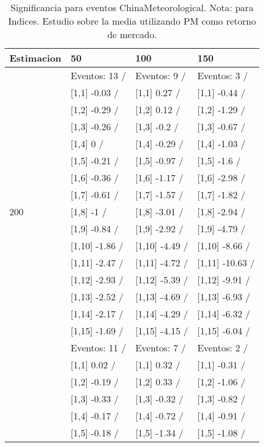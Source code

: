 \begin{table}

\caption{Significancia para eventos ChinaMeteorological. Nota: para Indices. Estudio sobre la media utilizando PM como retorno de mercado.}
\centering
\begin{tabular}[t]{llll}
\toprule
Estimacion & 50 & 100 & 150\\
\midrule
 & Eventos:  13 / & Eventos:  9 / & Eventos:  3 /\\
 & {}[1,1] -0.03  / & {}[1,1] 0.27  / & {}[1,1] -0.44  /\\
 & {}[1,2] -0.29  / & {}[1,2] 0.12  / & {}[1,2] -1.29  /\\
 & {}[1,3] -0.26  / & {}[1,3] -0.2  / & {}[1,3] -0.67  /\\
 & {}[1,4] 0  / & {}[1,4] -0.29  / & {}[1,4] -1.03  /\\
\addlinespace
 & {}[1,5] -0.21  / & {}[1,5] -0.97  / & {}[1,5] -1.6  /\\
 & {}[1,6] -0.36  / & {}[1,6] -1.17  / & {}[1,6] -2.98  /\\
 & {}[1,7] -0.61  / & {}[1,7] -1.57  / & {}[1,7] -1.82  /\\
200 & {}[1,8] -1  / & {}[1,8] -3.01  / & {}[1,8] -2.94  /\\
 & {}[1,9] -0.84  / & {}[1,9] -2.92  / & {}[1,9] -4.79  /\\
\addlinespace
 & {}[1,10] -1.86  / & {}[1,10] -4.49  / & {}[1,10] -8.66  /\\
 & {}[1,11] -2.47  / & {}[1,11] -4.72  / & {}[1,11] -10.63  /\\
 & {}[1,12] -2.93  / & {}[1,12] -5.39  / & {}[1,12] -9.91  /\\
 & {}[1,13] -2.52  / & {}[1,13] -4.69  / & {}[1,13] -6.93  /\\
 & {}[1,14] -2.17  / & {}[1,14] -4.29  / & {}[1,14] -6.32  /\\
\addlinespace
 & {}[1,15] -1.69  / & {}[1,15] -4.15  / & {}[1,15] -6.04  /\\
 & Eventos:  11 / & Eventos:  7 / & Eventos:  2 /\\
 & {}[1,1] 0.02  / & {}[1,1] 0.32  / & {}[1,1] -0.31  /\\
 & {}[1,2] -0.19  / & {}[1,2] 0.33  / & {}[1,2] -1.06  /\\
 & {}[1,3] -0.33  / & {}[1,3] -0.32  / & {}[1,3] -0.82  /\\
\addlinespace
 & {}[1,4] -0.17  / & {}[1,4] -0.72  / & {}[1,4] -0.91  /\\
 & {}[1,5] -0.18  / & {}[1,5] -1.34  / & {}[1,5] -1.08  /\\

\end{tabular}
\end{table}
